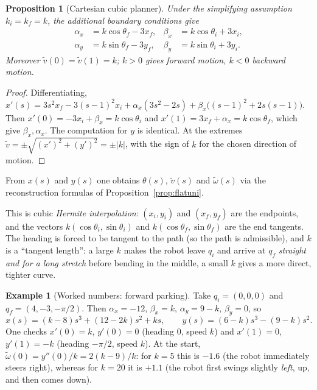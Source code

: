 \documentclass[11pt,a4paper]{article}
\def\boldsymbol#1{#1}%
\newcommand{\qi}{\boldsymbol{q}_i}
\newcommand{\qf}{\boldsymbol{q}_f}
\newcommand{\vt}{\tilde v}
\newcommand{\wt}{\tilde\omega}
\theoremstyle{definition}
\newtheorem{example}[definition]{Example}
\theoremstyle{plain}
\newtheorem{proposition}[definition]{Proposition}
\theoremstyle{remark}
\begin{document}
\begin{proposition}[Cartesian cubic planner]\label{prop:cart}
Under the simplifying assumption $k_i=k_f=k$, the additional boundary conditions give
\begin{equation}
\begin{aligned}
\alpha_x&=k\cos\theta_f-3x_f, & \beta_x&=k\cos\theta_i+3x_i,\\
\alpha_y&=k\sin\theta_f-3y_f, & \beta_y&=k\sin\theta_i+3y_i.
\end{aligned}
\end{equation}
Moreover $\vt(0)=\vt(1)=k$; $k>0$ gives forward motion, $k<0$ backward motion.
\end{proposition}
\begin{proof}
Differentiating,
$x'(s)=3s^2x_f-3(s-1)^2x_i+\alpha_x(3s^2-2s)+\beta_x\big((s-1)^2+2s(s-1)\big)$. Then $x'(0)=-3x_i+\beta_x=k\cos\theta_i$ and
$x'(1)=3x_f+\alpha_x=k\cos\theta_f$, which give $\beta_x,\alpha_x$. The computation for $y$ is identical. At the extremes
$\vt=\pm\sqrt{(x')^2+(y')^2}=\pm|k|$, with the sign of $k$ for the chosen direction of motion. \qedhere
\end{proof}

From $x(s)$ and $y(s)$ one obtains $\theta(s)$, $\vt(s)$ and $\wt(s)$ via the reconstruction formulas of
Proposition~\ref{prop:flatuni}.

\begin{intuition}
This is cubic \emph{Hermite interpolation}: $(x_i,y_i)$ and $(x_f,y_f)$ are the endpoints, and the vectors
$k(\cos\theta_i,\sin\theta_i)$ and $k(\cos\theta_f,\sin\theta_f)$ are the end tangents. The heading is forced to be tangent to
the path (so the path is admissible), and $k$ is a ``tangent length'': a large $k$ makes the robot leave $\qi$ and arrive at
$\qf$ \emph{straight and for a long stretch} before bending in the middle, a small $k$ gives a more direct, tighter curve.
\end{intuition}

\begin{example}[Worked numbers: forward parking]\label{ex:fwd}
Take $\qi=(0,0,0)$ and $\qf=(4,-3,-\pi/2)$. Then $\alpha_x=-12$, $\beta_x=k$, $\alpha_y=9-k$, $\beta_y=0$, so
\[
x(s)=(k-8)s^3+(12-2k)s^2+ks,\qquad y(s)=(6-k)s^3-(9-k)s^2 .
\]
One checks $x'(0)=k$, $y'(0)=0$ (heading $0$, speed $k$) and $x'(1)=0$, $y'(1)=-k$ (heading $-\pi/2$, speed $k$).
At the start, $\wt(0)=y''(0)/k=2(k-9)/k$: for $k=5$ this is $-1.6$ (the robot immediately steers right), whereas for $k=20$ it is
$+1.1$ (the robot first swings slightly \emph{left}, up, and then comes down).
\end{example}
\end{document}
